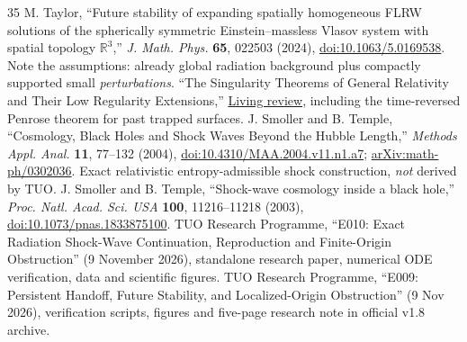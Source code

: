 \documentclass[11pt,a4paper]{article}
\theoremstyle{tmon}
\theoremstyle{definition}
\begin{document}
\begin{thebibliography}{35}
 M. Taylor, ``Future stability of expanding spatially homogeneous FLRW solutions of the spherically symmetric Einstein--massless Vlasov system with spatial topology $\mathbb R^3$,'' \emph{J. Math. Phys.} \textbf{65}, 022503 (2024), \href{https://doi.org/10.1063/5.0169538}{doi:10.1063/5.0169538}. Note the assumptions: already global radiation background plus compactly supported small \emph{perturbations}.
 ``The Singularity Theorems of General Relativity and Their Low Regularity Extensions,'' \href{https://pmc.ncbi.nlm.nih.gov/articles/PMC10228498/}{Living review}, including the time-reversed Penrose theorem for past trapped surfaces.
 J. Smoller and B. Temple, ``Cosmology, Black Holes and Shock Waves Beyond the Hubble Length,'' \emph{Methods Appl. Anal.} \textbf{11}, 77--132 (2004), \href{https://doi.org/10.4310/MAA.2004.v11.n1.a7}{doi:10.4310/MAA.2004.v11.n1.a7}; \href{https://arxiv.org/abs/math-ph/0302036}{arXiv:math-ph/0302036}. Exact relativistic entropy-admissible shock construction, \emph{not} derived by TUO.
 J. Smoller and B. Temple, ``Shock-wave cosmology inside a black hole,'' \emph{Proc. Natl. Acad. Sci. USA} \textbf{100}, 11216--11218 (2003), \href{https://doi.org/10.1073/pnas.1833875100}{doi:10.1073/pnas.1833875100}.
 TUO Research Programme, ``E010: Exact Radiation Shock-Wave Continuation, Reproduction and Finite-Origin Obstruction'' (9 November 2026), standalone research paper, numerical ODE verification, data and scientific figures.
 TUO Research Programme, ``E009: Persistent Handoff, Future Stability, and Localized-Origin Obstruction'' (9 Nov 2026), verification scripts, figures and five-page research note in official v1.8 archive.


\end{thebibliography}
\end{document}

